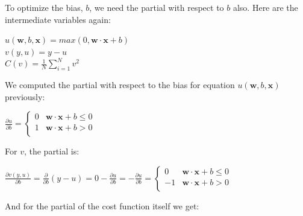 \documentclass[11pt]{article}
\begin{document}
To optimize the bias, $b$, we need the partial with respect to $b$ also.  Here are the intermediate variables again:

$u(\mathbf{w},b,\mathbf{x}) = max(0, \mathbf{w}\cdot\mathbf{x}+b)$\\
$v(y,u) = y - u$\\
$C(v) = \frac{1}{N} \sum_{i=1}^N v^2$

We computed the partial with respect to the bias for equation $u(\mathbf{w},b,\mathbf{x})$ previously:

$\frac{\partial u}{\partial b} = \begin{cases}
	0 & \mathbf{w} \cdot \mathbf{x} + b \leq 0\\
	1 & \mathbf{w} \cdot \mathbf{x} + b > 0\\
\end{cases}
$

For $v$, the partial is:

$
\frac{\partial v(y,u)}{\partial b} = \frac{\partial}{\partial b} (y - u) = 0 - \frac{\partial u}{\partial b} = -\frac{\partial u}{\partial b} = \begin{cases}
	0 & \mathbf{w} \cdot \mathbf{x} + b \leq 0\\
	-1 & \mathbf{w} \cdot \mathbf{x} + b > 0\\
\end{cases}
$

And for the partial of the cost function itself we get:
\end{document}
